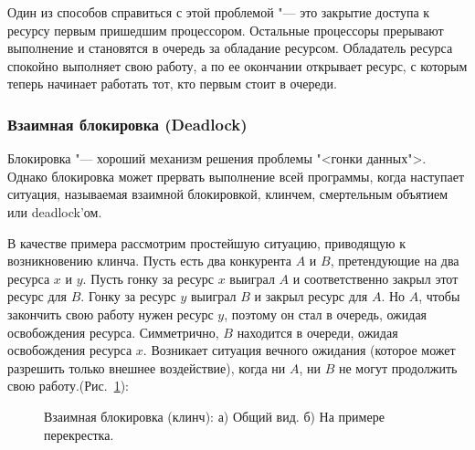\documentclass{article}
\begin{document}
				Один из способов справиться с этой проблемой "--- это закрытие доступа к ресурсу первым пришедшим процессором. 					Остальные процессоры прерывают выполнение и становятся в очередь за обладание ресурсом. Обладатель ресурса спокойно 				выполняет свою работу, а по ее окончании открывает ресурс, с которым теперь начинает работать тот, кто первым стоит в 			очереди.

				
			\subsubsection{Взаимная блокировка (Deadlock)}
				Блокировка "--- хороший механизм решения проблемы "<гонки данных">. Однако блокировка может прервать выполнение 				всей программы, когда наступает ситуация, называемая взаимной блокировкой, клинчем, смертельным объятием или 						deadlock'ом.
				
				В качестве примера рассмотрим простейшую ситуацию, приводящую к возникновению клинча. Пусть есть два конкурента 				$A$ и $B$, претендующие на два ресурса $x$ и $y$. Пусть гонку за ресурс $x$ выиграл $A$ и соответственно закрыл этот 				ресурс для $B$. Гонку за ресурс $y$ выиграл $B$ и закрыл ресурс для $A$. Но $A$, чтобы закончить свою работу нужен 					ресурс $y$, поэтому он стал в очередь, ожидая освобождения ресурса. Симметрично, $B$ находится в очереди, ожидая 					освобождения ресурса $x$. Возникает ситуация вечного ожидания (которое может разрешить только внешнее воздействие), 				когда ни $A$, ни $B$ не могут продолжить свою работу.(Рис.~\ref{ris:deadlock}):
			
			\begin{figure}[h!]
				\caption{Взаимная блокировка (клинч): а) Общий вид. б) На примере перекрестка.}
				\label{ris:deadlock}
			\end{figure}
	\newpage
	\newpage
\end{document}
